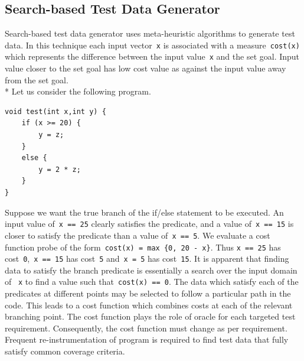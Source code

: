
\subsection{Search-based Test Data Generator} \label{sec:search_based_2}
Search-based test data generator uses meta-heuristic algorithms to generate test data. In this technique each input vector~\verb+x+ is associated with a measure~\verb+cost(x)+ which represents the difference between the input value~\verb+x+ and the set goal. Input value closer to the set goal has low cost value as against the input value away from the set goal. \\*
Let us consider the following program.
\bigskip
\bigskip

\begin{lstlisting}
void test(int x,int y) {
	if (x >= 20) {
		y = z; 
	}
	else {
		y = 2 * z;
	}
}
\end{lstlisting}
\bigskip

Suppose we want the true branch of the if/else statement to be executed. An input value of~\verb+x == 25+ clearly satisfies the predicate, and a value of~\verb+x == 15+ is closer to satisfy the predicate than a value of~\verb+x == 5+. We evaluate a cost function probe of the form~\verb+cost(x) = max {0, 20 - x}+. Thus \verb+x == 25+ has cost~\verb+0+,~\verb+x == 15+ has cost~\verb+5+ and~\verb+x = 5+ has cost~\verb+15+. It is apparent that finding data to satisfy the branch predicate is essentially a search over the input domain of ~\verb+x+ to find a value such that~\verb+cost(x) == 0+. The data which satisfy each of the predicates at different points may be selected to follow a particular path in the code. This leads to a cost function which combines costs at each of the relevant branching point. The cost function plays the role of oracle for each targeted test requirement. Consequently, the cost function must change as per requirement. Frequent re-instrumentation of program is required to find test data that fully satisfy common coverage criteria. 







